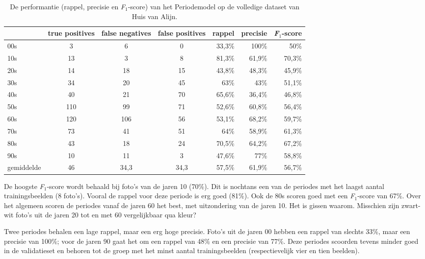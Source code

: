 \begin{table}
	\centering
    \renewcommand\arraystretch{1.2}
    \begin{tabular}{l|ccc|rrr}
        \toprule
        & true positives  & false negatives & false positives & rappel & precisie & \textit{F$_{1}$}-score \\ 
        \midrule
        00s & 3 & 6 & 0 & 33,3\% & 100\% & 50\% \\ 
        10s & 13 & 3 & 8 &  81,3\% & 61,9\% & 70,3\% \\ 
        20s & 14 & 18 & 15 & 43,8\% & 48,3\% & 45,9\% \\ 
        30s & 34 & 20 & 45  & 63\% & 43\% & 51,1\% \\ 
        40s & 40 & 21 & 70  & 65,6\% & 36,4\% & 46,8\% \\ 
        50s & 110 & 99 & 71  & 52,6\% & 60,8\% & 56,4\% \\ 
        60s & 120 & 106 & 56  & 53,1\% & 68,2\% & 59,7\% \\ 
        70s & 73 & 41 & 51  & 64\% & 58,9\% & 61,3\% \\ 
        80s & 43 & 18 & 24  & 70,5\% & 64,2\% & 67,2\% \\ 
        90s & 10 & 11 & 3  & 47,6\% & 77\% & 58,8\% \\ 
        \midrule
        gemiddelde & 46 & 34,3 & 34,3  & 57,5\% & 61,9\% & 56,7\% \\ 
        \bottomrule
    \end{tabular} 
    \caption{De performantie (rappel, precisie en \textit{F$_{1}$}-score) van het Periodemodel op de volledige dataset van Huis van Alijn.}
    \label{tab:resultaten-periodemodel}
\end{table}

De hoogste \textit{F$_{1}$}-score wordt behaald bij foto’s van de jaren 10 (70\%). Dit is nochtans een van de periodes met het laagst aantal trainingsbeelden (8 foto's). Vooral de rappel voor deze periode is erg goed (81\%). Ook de 80s scoren goed met een \textit{F$_{1}$}-score van 67\%. Over het algemeen scoren de periodes vanaf de jaren 60 het best, met uitzondering van de jaren 10. Het is gissen waarom. Misschien zijn zwart-wit foto’s uit de jaren 20 tot en met 60 vergelijkbaar qua kleur?

Twee periodes behalen een lage rappel, maar een erg hoge precisie. Foto’s uit de jaren 00 hebben een rappel van slechts 33\%, maar een precisie van 100\%; voor de jaren 90 gaat het om een rappel van 48\% en een precisie van 77\%. Deze periodes scoorden tevens minder goed in de validatieset en behoren tot de groep met het minst aantal trainingsbeelden (respectievelijk vier en tien beelden). 

